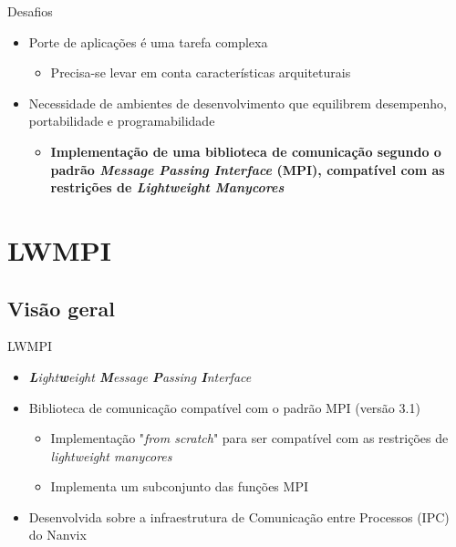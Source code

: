 \documentclass{beamer}
\begin{document}
    \begin{frame}{Desafios}
      \begin{itemize}
        \item Porte de aplicações é uma tarefa complexa
        \begin{itemize}
          \item Precisa-se levar em conta características arquiteturais
        \end{itemize}
        \item Necessidade de ambientes de desenvolvimento que equilibrem desempenho,
          portabilidade e programabilidade
        \begin{itemize}
          \item \textbf{Implementação de uma biblioteca de comunicação segundo o
            padrão \textit{Message Passing Interface} (MPI), compatível com as
            restrições de \textit{Lightweight Manycores}}
        \end{itemize}
      \end{itemize}
    \end{frame}


\section{LWMPI}

  \subsection{Visão geral}
    \begin{frame}{LWMPI}
      \begin{itemize}
        \item \textit{\textbf{L}ight\textbf{w}eight \textbf{M}essage \textbf{P}assing \textbf{I}nterface}
        \item Biblioteca de comunicação compatível com o padrão MPI (versão 3.1)
        \begin{itemize}
          \item Implementação "\textit{from scratch}" para ser compatível com as
            restrições de \textit{lightweight manycores}
          \item Implementa um subconjunto das funções MPI
        \end{itemize}
        \item Desenvolvida sobre a infraestrutura de Comunicação entre Processos (IPC) do Nanvix
      \end{itemize}
    \end{frame}
\end{document}
